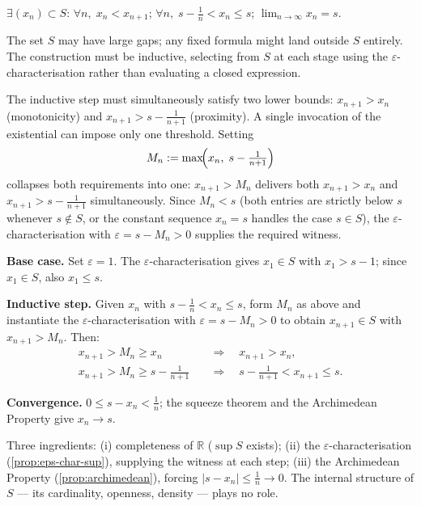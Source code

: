 \begin{remark}
$\exists(x_n)\subset S$: $\forall n,\;x_n<x_{n+1}$;\;
$\forall n,\;s-\tfrac{1}{n}<x_n\leq s$;\;
$\lim_{n\to\infty}x_n=s$.
\end{remark}

\begin{remark}
The set $S$ may have large gaps; any fixed formula might land outside $S$
entirely. The construction must be inductive, selecting from $S$ at each
stage using the $\varepsilon$-characterisation rather than evaluating a
closed expression.
\end{remark}

\begin{remark}
The inductive step must simultaneously satisfy two lower bounds:
$x_{n+1}>x_n$ (monotonicity) and $x_{n+1}>s-\tfrac{1}{n+1}$ (proximity).
A single invocation of the existential can impose only one threshold. Setting
\[
  M_n:=\max\!\Bigl(x_n,\;s-\tfrac{1}{n+1}\Bigr)
\]
collapses both requirements into one: $x_{n+1}>M_n$ delivers both
$x_{n+1}>x_n$ and $x_{n+1}>s-\tfrac{1}{n+1}$ simultaneously. Since
$M_n<s$ (both entries are strictly below $s$ whenever $s\notin S$, or
the constant sequence $x_n=s$ handles the case $s\in S$), the
$\varepsilon$-characterisation with $\varepsilon=s-M_n>0$ supplies the
required witness.

\medskip
\noindent\textbf{Base case.} Set $\varepsilon=1$. The
$\varepsilon$-characterisation gives $x_1\in S$ with $x_1>s-1$; since
$x_1\in S$, also $x_1\leq s$.

\noindent\textbf{Inductive step.} Given $x_n$ with
$s-\tfrac{1}{n}<x_n\leq s$, form $M_n$ as above and instantiate the
$\varepsilon$-characterisation with $\varepsilon=s-M_n>0$ to obtain
$x_{n+1}\in S$ with $x_{n+1}>M_n$. Then:
\begin{align*}
  x_{n+1}>M_n\geq x_n
    &\quad\Rightarrow\quad x_{n+1}>x_n, \\
  x_{n+1}>M_n\geq s-\tfrac{1}{n+1}
    &\quad\Rightarrow\quad s-\tfrac{1}{n+1}<x_{n+1}\leq s.
\end{align*}

\noindent\textbf{Convergence.} $0\leq s-x_n<\tfrac{1}{n}$; the squeeze
theorem and the Archimedean Property give $x_n\to s$.
\end{remark}

\begin{remark}
Three ingredients: (i) completeness of $\mathbb{R}$ ($\sup S$ exists);
(ii) the $\varepsilon$-characterisation (\cref{prop:eps-char-sup}), supplying
the witness at each step; (iii) the Archimedean Property
(\cref{prop:archimedean}), forcing $|s-x_n|\leq\tfrac{1}{n}\to 0$.
The internal structure of $S$ --- its cardinality, openness, density ---
plays no role.
\end{remark}

